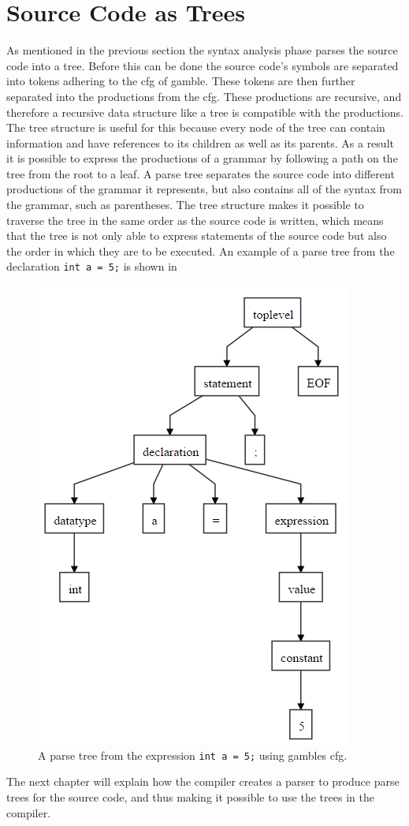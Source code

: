 \section{Source Code as Trees}\label{SourceCodeAsTrees}
As mentioned in the previous section the syntax analysis phase parses the source code into a tree.
Before this can be done the source code's symbols are separated into tokens adhering to the \acrshort{cfg} of \gls{gamble}.
These tokens are then further separated into the productions from the \acrshort{cfg}. 
These productions are recursive, and therefore a recursive data structure like a tree is compatible with the productions.
The tree structure is useful for this because every node of the tree can contain information and have references to its children as well as its parents. 
As a result it is possible to express the productions of a grammar by following a path on the tree from the root to a leaf.
A parse tree separates the source code into different productions of the grammar it represents, but also contains all of the syntax from the grammar, such as parentheses.
The tree structure makes it possible to traverse the tree in the same order as the source code is written, which means that the tree is not only able to express statements of the source code but also the order in which they are to be executed.
An example of a parse tree from the declaration \texttt{int a = 5;} is shown in 

\begin{figure}[ht]
    \centering
    \includegraphics[width=0.5\linewidth]{figures/Trees/PST.PNG}
    \caption{A parse tree from the expression \texttt{int a = 5;} using \glspl{gamble} \acrshort{cfg}.}\label{image:PST}
\end{figure}

The next chapter will explain how the compiler creates a parser to produce parse trees for the source code, and thus making it possible to use the trees in the compiler.
